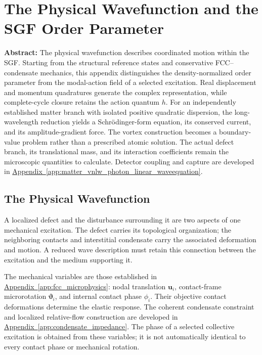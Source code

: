 \chapter{The Physical Wavefunction and the SGF Order Parameter}
\label{app:physical_wavefunction}

\noindent\textbf{Abstract:}
The physical wavefunction describes coordinated motion within the SGF. Starting from the structural reference states and conservative FCC--condensate mechanics, this appendix distinguishes the density-normalized order parameter from the modal-action field of a selected excitation. Real displacement and momentum quadratures generate the complex representation, while complete-cycle closure retains the action quantum $h$. For an independently established matter branch with isolated positive quadratic dispersion, the long-wavelength reduction yields a Schr\"{o}dinger-form equation, its conserved current, and its amplitude-gradient force. The vortex construction becomes a boundary-value problem rather than a prescribed atomic solution. The actual defect branch, its translational mass, and its interaction coefficients remain the microscopic quantities to calculate. Detector coupling and capture are developed in \hyperref[app:matter_vnlw_photon_linear_waveequation]{Appendix~\ref*{app:matter_vnlw_photon_linear_waveequation}}.

\section{The Physical Wavefunction}

A localized defect and the disturbance surrounding it are two aspects of one mechanical excitation. The defect carries its topological organization; the neighboring contacts and interstitial condensate carry the associated deformation and motion. A reduced wave description must retain this connection between the excitation and the medium supporting it.

The mechanical variables are those established in \hyperref[app:fcc_microphysics]{Appendix~\ref*{app:fcc_microphysics}}: nodal translation $\mathbf u_i$, contact-frame microrotation $\boldsymbol\vartheta_i$, and internal contact phase $\phi_i$. Their objective contact deformations determine the elastic response. The coherent condensate constraint and localized relative-flow construction are developed in \hyperref[app:condensate_impedance]{Appendix~\ref*{app:condensate_impedance}}. The phase of a selected collective excitation is obtained from these variables; it is not automatically identical to every contact phase or mechanical rotation.

